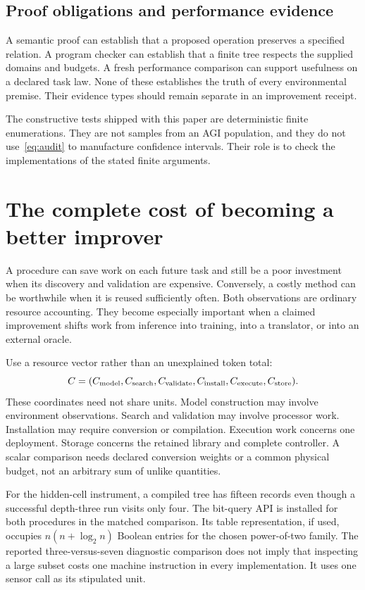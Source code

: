 \documentclass[11pt,letterpaper]{article}
\theoremstyle{plain}
\theoremstyle{definition}
\begin{document}
\subsection{Proof obligations and performance evidence}
A semantic proof can establish that a proposed operation preserves a specified relation. A program checker can establish that a finite tree respects the supplied domains and budgets. A fresh performance comparison can support usefulness on a declared task law. None of these establishes the truth of every environmental premise. Their evidence types should remain separate in an improvement receipt.

The constructive tests shipped with this paper are deterministic finite enumerations. They are not samples from an AGI population, and they do not use~\eqref{eq:audit} to manufacture confidence intervals. Their role is to check the implementations of the stated finite arguments.

\section{The complete cost of becoming a better improver}\label{sec:cost}
A procedure can save work on each future task and still be a poor investment when its discovery and validation are expensive. Conversely, a costly method can be worthwhile when it is reused sufficiently often. Both observations are ordinary resource accounting. They become especially important when a claimed improvement shifts work from inference into training, into a translator, or into an external oracle.

Use a resource vector rather than an unexplained token total:
\[
C=(C_{\rm model},C_{\rm search},C_{\rm validate},C_{\rm install},
C_{\rm execute},C_{\rm store}).
\]
These coordinates need not share units. Model construction may involve environment observations. Search and validation may involve processor work. Installation may require conversion or compilation. Execution work concerns one deployment. Storage concerns the retained library and complete controller. A scalar comparison needs declared conversion weights or a common physical budget, not an arbitrary sum of unlike quantities.

For the hidden-cell instrument, a compiled tree has fifteen records even though a successful depth-three run visits only four. The bit-query API is installed for both procedures in the matched comparison. Its table representation, if used, occupies $n(n+\log_2n)$ Boolean entries for the chosen power-of-two family. The reported three-versus-seven diagnostic comparison does not imply that inspecting a large subset costs one machine instruction in every implementation. It uses one sensor call as its stipulated unit.
\end{document}
